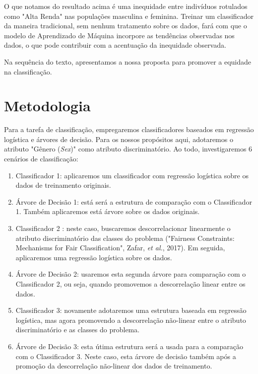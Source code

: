 \documentclass[11pt]{article}
\begin{document}
    
    
    O que notamos do resultado acima é uma inequidade entre indivíduos
rotulados como "Alta Renda" nas populações masculina e feminina. Treinar
um classificador da maneira tradicional, sem nenhum tratamento sobre os
dados, fará com que o modelo de Aprendizado de Máquina incorpore as
tendências observadas nos dados, o que pode contribuir com a acentuação
da inequidade observada.

Na sequência do texto, apresentamos a nossa proposta para promover a
equidade na classificação.

    \section{Metodologia}\label{metodologia}

Para a tarefa de classificação, empregaremos classificadores baseados em
regressão logística e árvores de decisão. Para os nossos propósitos
aqui, adotaremos o atributo "Gênero (\emph{Sex})" como atributo
discriminatório. Ao todo, investigaremos 6 cenários de classificação:

\begin{enumerate}
\def\labelenumi{\arabic{enumi})}
\item
  Classificador 1: aplicaremos um classificador com regressão logística
  sobre os dados de treinamento originais.
\item
  Árvore de Decisão 1: está será a estrutura de comparação com o
  Classificador 1. Também aplicaremos está árvore sobre os dados
  originais.
\item
  Classificador 2 : neste caso, buscaremos descorrelacionar linearmente
  o atributo discriminatório das classes do problema ("Fairness
  Constraints: Mechanisms for Fair Classification", Zafar, \emph{et
  al.}, 2017). Em seguida, aplicaremos uma regressão logística sobre os
  dados.
\item
  Árvore de Decisão 2: usaremos esta segunda árvore para comparação com
  o Classificador 2, ou seja, quando promovemos a descorrelação linear
  entre os dados.
\item
  Classificador 3: novamente adotaremos uma estrutura baseada em
  regressão logística, mas agora promovendo a descorrelação não-linear
  entre o atributo discriminatório e as classes do problema.
\item
  Árvore de Decisão 3: esta útima estrutura será a usada para a
  comparação com o Classificador 3. Neste caso, esta árvore de decisão
  também após a promoção da descorrelação não-linear dos dados de
  treinamento.
\end{enumerate}
\end{document}
